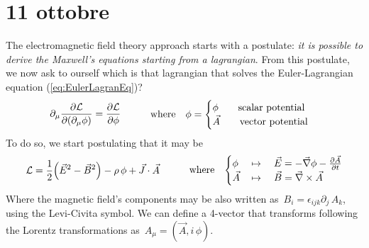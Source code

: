 \documentclass[class=article]{standalone}
\begin{document}
\section{11 ottobre}
The electromagnetic field theory approach starts with a postulate: \emph{it is possible to derive the Maxwell's equations starting from a lagrangian}.
From this postulate, we now ask to ourself which is that lagrangian that solves the Euler-Lagrangian equation (\ref{eq:EulerLagranEq})?
\begin{equation*}
\begin{split}
\partial_{\mu} \pdv{\mathcal{L}}{(\partial_{\mu} \phi)} = \pdv{\mathcal{L}}{\phi}
\end{split} 
\quad\quad\quad\mbox{where}\quad
\begin{split}
\phi = 
\begin{cases}
\phi \quad\quad \mbox{scalar potential} \\
\vec A \quad\quad \mbox{vector potential} 
\end{cases}
\end{split}
\label{eq:EulerLagranEq}
\end{equation*}
To do so, we start postulating that it may be
\begin{equation*}
\begin{split}
\mathcal{L} = \frac{1}{2} \Big( \vec E^2 - \vec B^2 \Big) - \rho \, \phi + \vec J \cdot \vec A
\end{split}
\quad\quad\quad\mbox{where}\quad
\begin{split}
\begin{cases}
\phi \, & \mapsto \quad \vec E = - \vec \nabla \phi - \pdv{\vec A}{t}  \\
\vec A \, & \mapsto \quad \vec B = \vec \nabla \times \vec A 
\end{cases}
\end{split}
\end{equation*}
Where the magnetic field's components may be also written as $\, B_i = \epsilon_{i j k} \partial_j \, A_k$, using the Levi-Civita symbol.
We can define a 4-vector that transforms following the Lorentz transformations as $\, A_{\mu} = (\vec A , i \, \phi) $.
\end{document}
